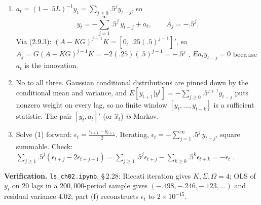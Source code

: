 \documentclass[12pt, letterpaper]{article}
\newcommand{\nb}[1]{\texttt{ls\_ch02.ipynb}, \S\,#1}
\begin{document}
\begin{tcolorbox}[evenbox,title={Exercise 2.28 \quad Invertibility}]
\begin{enumerate}
$y_{t-1}$, $\epsilon_{t-1}$ remains uncertain.)
\item $a_t=(1-.5L)^{-1}y_t=\sum_{j\ge0}.5^jy_{t-j}$, so
\[
\boxed{y_t=-\sum_{j=1}^\infty .5^j\,y_{t-j}+a_t,\qquad A_j=-.5^j}.
\]
Via (2.9.3): $(A-KG)^{j-1}K=[0,\ .25(.5)^{j-1}]'$, so $A_j=G(A-KG)^{j-1}K=-2(.25)(.5)^{j-1}=-.5^j$ \checkmark.
$Ea_ty_{t-j}=0$ because $a_t$ is the innovation.
\item No to all three. Gaussian conditional distributions are pinned down by the conditional mean
and variance, and $E[y_{t+1}|y^t]=-\sum_{j\ge0}.5^{j+1}y_{t-j}$ puts nonzero weight on every lag, so no
finite window $[y_t,\dots,y_{t-k}]$ is a sufficient statistic. The pair $[y_t,a_t]'$ (or $\hat x_t$)
\emph{is} Markov.
\item Solve (1) forward: $\epsilon_{t}=\frac{\epsilon_{t+1}-y_{t+1}}{2}$. Iterating,
$\boxed{\epsilon_t=-\sum_{j=1}^\infty.5^j\,y_{t+j}}$, square summable. Check:
$\sum_{j\ge1}.5^j(\epsilon_{t+j}-2\epsilon_{t+j-1})=\sum_{j\ge1}.5^j\epsilon_{t+j}-\sum_{k\ge0}.5^k\epsilon_{t+k}=-\epsilon_t$ \checkmark.
\end{enumerate}

\textbf{Verification.} \nb{2.28}: Riccati iteration gives $K,\Sigma,\Omega=4$; OLS of $y_t$ on 20 lags
in a $200{,}000$-period sample gives $(-.498,-.246,-.123,\dots)$ and residual variance $4.02$; part (f)
reconstructs $\epsilon_t$ to $2\times10^{-15}$. \checkmark
\end{tcolorbox}
\end{document}
